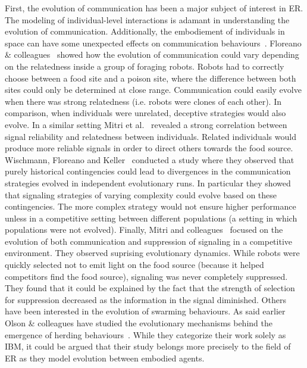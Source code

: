        First, the evolution of communication has been a major subject of interest in ER. The modeling of individual-level interactions is adamant in understanding the evolution of communication. Additionally, the embodiement of individuals in space can have some unexpected effects on communication behaviours~\parencite{Mitri2009}. Floreano \& colleagues~\parencite{Floreano2007} showed how the evolution of communication could vary depending on the relatedness inside a group of foraging robots. Robots had to correctly choose between a food site and a poison site, where the difference between both sites could only be determined at close range. Communication could easily evolve when there was strong relatedness (i.e. robots were clones of each other). In comparison, when individuals were unrelated, deceptive strategies would also evolve. In a similar setting Mitri et al.~\parencite{Mitri2011} revealed a strong correlation between signal reliability and relatedness between individuals. Related individuals would produce more reliable signals in order to direct others towards the food source. Wischmann, Floreano and Keller~\parencite{Wischmann2012} conducted a study where they observed that purely historical contingencies could lead to divergences in the communication strategies evolved in independent evolutionary runs. In particular they showed that signaling strategies of varying complexity could evolve based on these contingencies. The more complex strategy would not ensure higher performance unless in a competitive setting between different populations (a setting in which populations were not evolved). Finally, Mitri and colleagues~\parencite{Mitri2009} focused on the evolution of both communication and suppression of signaling in a competitive environment. They observed suprising evolutionary dynamics. While robots were quickly selected not to emit light on the food source (because it helped competitors find the food source), signaling was never completely suppressed. They found that it could be explained by the fact that the strength of selection for suppression decreased as the information in the signal diminished. Others have been interested in the evolution of swarming behaviours. As said earlier Olson \& colleagues have studied the evolutionary mechanisms behind the emergence of herding behaviours~\parencite{Olson2013, Olson2013a, Haley2014}. While they categorize their work solely as IBM, it could be argued that their study belongs more precisely to the field of ER as they model evolution between embodied agents.

